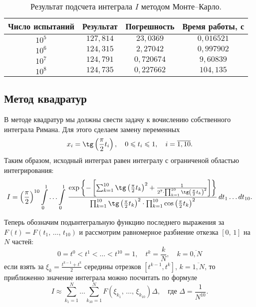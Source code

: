 \begin{table}[h]
\begin{center}
\begin{tabular}{|c|c|c|c|}
\hline
Число испытаний &
Результат  &
Погрешность &
Время работы, с
\\
\hline
$10^5$
&
$127,814$
&
$23,0369$
&
$0,016521$
\\
\hline
$10^6$
&
$124,315$
&
$2,27042$
&
$0,997902$
\\
\hline
$10^7$
&
$124,791$
&
$0,720674$
&
$9,60839$
\\
\hline
$10^8$
&
$124,735$
&
$0,227662$
&
$104,135$
\\
\hline
\end{tabular}
\end{center}
\caption{Результат подсчета интеграла $I$ методом Монте--Карло.}
\end{table}


\subsection{Метод квадратур}

В методе квадратур мы должны свести задачу к вочислению собственного интеграла Римана. Для этого сделаем замену переменных
$$
        x_i = \tg\left(\frac{\pi}{2}t_i\right), \quad 0 \leqslant t_i \leqslant 1, \quad i = \overline{1, 10}.
$$
Таким образом, исходный интеграл равен интегралу с ограниченой областью интегрирования:
$$
        I
        =
        \left(\frac{\pi}{2}\right)^{10}
        \int\limits_{0}^{1}\ldots\int\limits_{0}^{1}\,
        \frac
        {
                \exp\left\{
                -\left[
                        \sum_{k=1}^{10}\tg\left(\frac{\pi}{2}t_k\right)^2
                        +
                        \frac
                        {
                                1 
                        }
                        {
                                2^7
                                \cdot
                                \prod_{k=1}^{10}\tg\left(\frac{\pi}{2}t_k\right)^2
                        }
                \right]
                \right\}
        }
        {
                \prod_{k=1}^{10}\tg\left(\frac{\pi}{2}t_k\right)^2
                \cdot
                \prod_{k=1}^{10}\cos\left(\frac{\pi}{2}t_k\right)^2
        }
        \,dt_1\ldots dt_{10}.
$$

Теперь обозначим подынтегральную функцию последнего выражения за $F(t) = F(t_1,\,\ldots,\,t_{10})$ и рассмотрим равномерное разбиение откезка $[0,\,1]$ на $N$ частей:
$$
        0 = t^0 < t^1 < \ldots < t^{10} = 1,
        \quad
        t^k = \frac{k}{N},
        \quad
        k = \overline{0, N}
$$
если взять за $\xi_k = \frac{t^{k-1} + t^k}{2}$ середины отрезков $[t^{k-1}, t^k]$, $k=\overline{1,N}$, то приближенно значение интеграла можно посчитать по формуле
$$
        I
        \approx
        \sum_{k_1 = 1}^N
        \ldots
        \sum_{k_{10} = 1}^N
        F(\xi_{k_1},\,\ldots,\,\xi_{k_{10}})\Delta,
        \quad
        \mbox{где } \Delta = \frac{1}{N^{10}}.
$$

